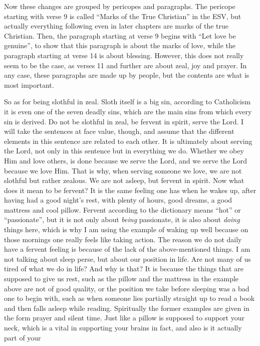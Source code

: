 Now these changes are grouped by pericopes and paragraphs. The pericope
starting with verse 9 is called ``Marks of the True Christian'' in the
ESV, but actually everything following even in later chapters are marks
of the true Christian. Then, the paragraph starting at verse 9 begins
with ``Let love be genuine'', to show that this paragraph is about the
marks of love, while the paragraph starting at verse 14 is about
blessing. However, this does not really seem to be the case, as verses
11 and further are about zeal, joy and prayer. In any case, these
paragraphs are made up by people, but the contents are what is most
important.

So as for being slothful in zeal. Sloth itself is a big sin, according
to Catholicism it is even one of the seven deadly sins, which are the
main sins from which every sin is derived. Do not be slothful in zeal,
be fervent in spirit, serve the Lord. I will take the sentences at face
value, though, and assume that the different elements in this sentence
are related to each other. It is ultimately about serving the Lord, not
only in this sentence but in everything we do. Whether we obey Him and
love others, is done because we serve the Lord, and we serve the Lord
because we love Him. That is why, when serving someone we love, we are
not slothful but rather zealous. We are not asleep, but fervent in
spirit. Now what does it mean to be fervent? It is the same feeling one
has when he wakes up, after having had a good night's rest, with plenty
of hours, good dreams, a good mattress and cool pillow. Fervent
according to the dictionary means ``hot'' or ``passionate'', but it is
not only about \emph{being} passionate, it is also about \emph{doing}
things here, which is why I am using the example of waking up well
because on those mornings one really feels like taking action. The
reason we do not daily have a fervent feeling is because of the lack of
the above-mentioned things. I am not talking about sleep perse, but
about our position in life. Are not many of us tired of what we do in
life? And why is that? It is because the things that are supposed to
give us rest, such as the pillow and the mattress in the example above
are not of good quality, or the position we take before sleeping was a
bad one to begin with, such as when someone lies partially straight up
to read a book and then falls asleep while reading. Spiritually the
former examples are given in the form prayer and silent time. Just like
a pillow is supposed to support your neck, which is a vital in
supporting your brains in fact, and also is it actually part of your
